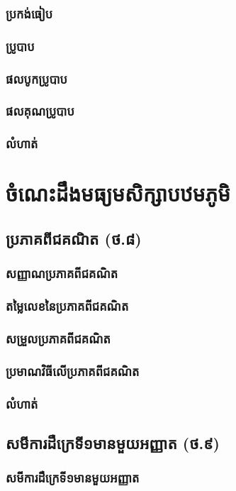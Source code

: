 \documentclass[a4paper,12pt,blue]{pptec}
\begin{document}
	\section{ប្រកង់ធៀប}
	\section{ប្រូបាប}
	\section{ផលបូកប្រូបាប}
	\section{ផលគុណប្រូបាប}
	\section{លំហាត់}
	\part{ចំណេះដឹងមធ្យមសិក្សាបឋមភូមិ}
	\chapter{ប្រភាគពីជគណិត (ថ.៨)}
	\section{សញ្ញាណប្រភាគពីជគណិត}
	\section{តម្លៃលេខនៃប្រភាគពីជគណិត}
	\section{សម្រួលប្រភាគពីជគណិត}
	\section{ប្រមាណវិធីលើប្រភាគពីជគណិត}
	\section{លំហាត់}
	\chapter{សមីការដឺក្រេទី១មានមួយអញ្ញាត (ថ.៩)}
	\section{សមីការដឺក្រេទី១មានមួយអញ្ញាត}
\end{document}
